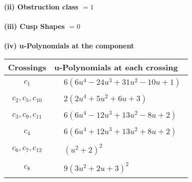 \documentclass[1p]{elsarticle_modified}
\theoremstyle{definition}
\begin{document}
\flushleft \textbf{(ii) Obstruction class $= 1$}\\~\\
\flushleft \textbf{(iii) Cusp Shapes $= 0$}\\~\\
\newpage\renewcommand{\arraystretch}{1}
\flushleft \textbf{(iv) u-Polynomials at the component}\newline \\
\begin{tabular}{m{50pt}|m{274pt}}
Crossings & \hspace{64pt}u-Polynomials at each crossing \\
\hline $$\begin{aligned}c_{1}\end{aligned}$$&$\begin{aligned}
&6(6 u^4-24 u^3+31 u^2-10 u+1)
\end{aligned}$\\
\hline $$\begin{aligned}c_{2},c_{5},c_{10}\end{aligned}$$&$\begin{aligned}
&2(2 u^4+5 u^2+6 u+3)
\end{aligned}$\\
\hline $$\begin{aligned}c_{3},c_{9},c_{11}\end{aligned}$$&$\begin{aligned}
&6(6 u^4-12 u^3+13 u^2-8 u+2)
\end{aligned}$\\
\hline $$\begin{aligned}c_{4}\end{aligned}$$&$\begin{aligned}
&6(6 u^4+12 u^3+13 u^2+8 u+2)
\end{aligned}$\\
\hline $$\begin{aligned}c_{6},c_{7},c_{12}\end{aligned}$$&$\begin{aligned}
&(u^2+2)^2
\end{aligned}$\\
\hline $$\begin{aligned}c_{8}\end{aligned}$$&$\begin{aligned}
&9(3 u^2+2 u+3)^2
\end{aligned}$\\
\hline
\end{tabular}\\~\\
\end{document}
